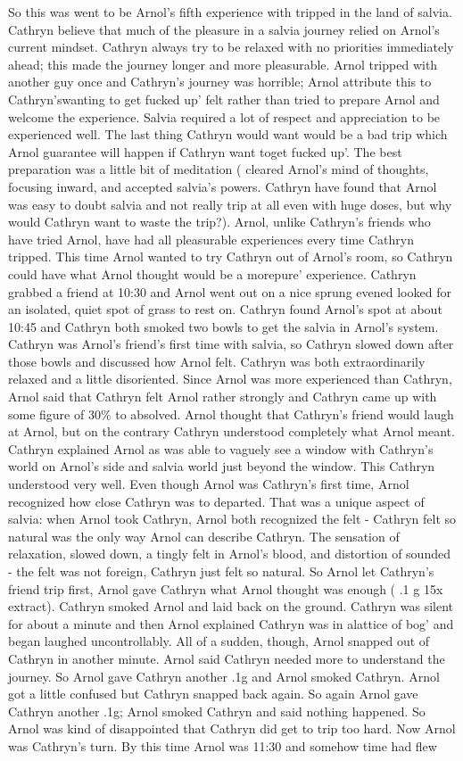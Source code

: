 \documentclass[12pt]{book}
\begin{document}
So this was went to be Arnol's fifth experience with tripped in the land of salvia. Cathryn believe that much of the pleasure in a salvia journey relied on Arnol's current mindset. Cathryn always try to be relaxed with no priorities immediately ahead; this made the journey longer and more pleasurable. Arnol tripped with another guy once and Cathryn's journey was horrible; Arnol attribute this to Cathryn'swanting to get fucked up' felt rather than tried to prepare Arnol and welcome the experience. Salvia required a lot of respect and appreciation to be experienced well. The last thing Cathryn would want would be a bad trip which Arnol guarantee will happen if Cathryn want toget fucked up'. The best preparation was a little bit of meditation ( cleared Arnol's mind of thoughts, focusing inward, and accepted salvia's powers. Cathryn have found that Arnol was easy to doubt salvia and not really trip at all even with huge doses, but why would Cathryn want to waste the trip?). Arnol, unlike Cathryn's friends who have tried Arnol, have had all pleasurable experiences every time Cathryn tripped. This time Arnol wanted to try Cathryn out of Arnol's room, so Cathryn could have what Arnol thought would be a morepure' experience. Cathryn grabbed a friend at 10:30 and Arnol went out on a nice sprung evened looked for an isolated, quiet spot of grass to rest on. Cathryn found Arnol's spot at about 10:45 and Cathryn both smoked two bowls to get the salvia in Arnol's system. Cathryn was Arnol's friend's first time with salvia, so Cathryn slowed down after those bowls and discussed how Arnol felt. Cathryn was both extraordinarily relaxed and a little disoriented. Since Arnol was more experienced than Cathryn, Arnol said that Cathryn felt Arnol rather strongly and Cathryn came up with some figure of 30\% to absolved. Arnol thought that Cathryn's friend would laugh at Arnol, but on the contrary Cathryn understood completely what Arnol meant. Cathryn explained Arnol as was able to vaguely see a window with Cathryn's world on Arnol's side and salvia world just beyond the window. This Cathryn understood very well. Even though Arnol was Cathryn's first time, Arnol recognized how close Cathryn was to departed. That was a unique aspect of salvia: when Arnol took Cathryn, Arnol both recognized the felt - Cathryn felt so natural was the only way Arnol can describe Cathryn. The sensation of relaxation, slowed down, a tingly felt in Arnol's blood, and distortion of sounded - the felt was not foreign, Cathryn just felt so natural. So Arnol let Cathryn's friend trip first, Arnol gave Cathryn what Arnol thought was enough ( .1 g 15x extract). Cathryn smoked Arnol and laid back on the ground. Cathryn was silent for about a minute and then Arnol explained Cathryn was in alattice of bog' and began laughed uncontrollably. All of a sudden, though, Arnol snapped out of Cathryn in another minute. Arnol said Cathryn needed more to understand the journey. So Arnol gave Cathryn another .1g and Arnol smoked Cathryn. Arnol got a little confused but Cathryn snapped back again. So again Arnol gave Cathryn another .1g; Arnol smoked Cathryn and said nothing happened. So Arnol was kind of disappointed that Cathryn did get to trip too hard. Now Arnol was Cathryn's turn. By this time Arnol was 11:30 and somehow time had flew 
\end{document}
